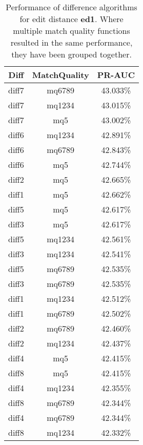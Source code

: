 \begin{table}[tbph]
\begin{center}
\begin{tabular}{|c|c||c|}
\hline
Diff & MatchQuality & PR-AUC  \\
\hline
\hline
diff7 & mq6789 & 43.033\% \\
diff7 & mq1234 & 43.015\% \\
diff7 & mq5 & 43.002\% \\
diff6 & mq1234 & 42.891\% \\
diff6 & mq6789 & 42.843\% \\
diff6 & mq5 & 42.744\% \\
diff2 & mq5 & 42.665\% \\
diff1 & mq5 & 42.662\% \\
diff5 & mq5 & 42.617\% \\
diff3 & mq5 & 42.617\% \\
diff5 & mq1234 & 42.561\% \\
diff3 & mq1234 & 42.541\% \\
diff5 & mq6789 & 42.535\% \\
diff3 & mq6789 & 42.535\% \\
diff1 & mq1234 & 42.512\% \\
diff1 & mq6789 & 42.502\% \\
diff2 & mq6789 & 42.460\% \\
diff2 & mq1234 & 42.437\% \\
diff4 & mq5 & 42.415\% \\
diff8 & mq5 & 42.415\% \\
diff4 & mq1234 & 42.355\% \\
diff8 & mq6789 & 42.344\% \\
diff4 & mq6789 & 42.344\% \\
diff8 & mq1234 & 42.332\% \\
\hline
\end{tabular}
\end{center}
\caption{Performance of difference algorithms for
  edit distance \textbf{ed1}.  Where multiple match
  quality functions resulted in the same performance, they
  have been grouped together.}
\label{tab:editlongbyed1}
\end{table}
